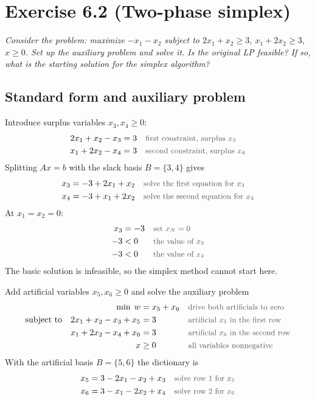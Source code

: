 \documentclass[a4paper,11pt]{article}
\newif\ifexplain
\newcommand{\aufgabe}[1]{\section*{#1}}
\newcommand{\angabe}[1]{\textit{#1}\par\smallskip}
\newcommand{\teil}[1]{\subsection*{#1}}
\newcommand{\why}[1]{\text{\small\color{black!65}#1}}
\newcommand{\explain}[1]{\ifexplain\begin{erklbox}#1\end{erklbox}\fi}
\begin{document}
\aufgabe{Exercise 6.2 (Two-phase simplex)}
\angabe{Consider the problem: maximize $-x_1-x_2$ subject to $2x_1+x_2\geq 3$, $x_1+2x_2\geq 3$, $x\geq 0$. Set up the auxiliary problem and solve it. Is the original LP feasible? If so, what is the starting solution for the simplex algorithm?}
\explain{Beide Nebenbedingungen sind $>$-Ungleichungen mit positiver rechter Seite. Der Ursprung verletzt sie, also gibt es keine zulässige Schlupfbasis zum Starten. Die Idee der zwei Phasen: künstliche Variablen $x_5,x_6$ machen die Gleichungen sofort lösbar, und Phase 1 drückt sie anschließend auf null. Gelingt das, bleibt eine zulässige Basis des Originalproblems übrig.}
\teil{Standard form and auxiliary problem}
Introduce surplus variables $x_3,x_4\geq 0$:
\begin{align*}
2x_1+x_2-x_3&=3&&\why{first constraint, surplus $x_3$}\\
x_1+2x_2-x_4&=3&&\why{second constraint, surplus $x_4$}
\end{align*}
Splitting $Ax=b$ with the slack basis $B=\{3,4\}$ gives
\begin{align*}
x_3&=-3+2x_1+x_2&&\why{solve the first equation for $x_3$}\\
x_4&=-3+x_1+2x_2&&\why{solve the second equation for $x_4$}
\end{align*}
At $x_1=x_2=0$:
\begin{align*}
x_3&=-3&&\why{set $x_N=0$}\\
-3&<0&&\why{the value of $x_3$}\\
-3&<0&&\why{the value of $x_4$}
\end{align*}
The basic solution is infeasible, so the simplex method cannot start here.
\explain{Die Schlupfvariable geht bei einer $>$-Ungleichung mit minus rein: $2x_1+x_2-x_3=3$ heißt, $x_3$ misst den Überschuss über die Schranke. Am Nullpunkt fehlt es noch an Erfüllung, deshalb ist $x_3$ negativ. Genau dieses Problem lösen die künstlichen Variablen.}
Add artificial variables $x_5,x_6\geq 0$ and solve the auxiliary problem
\begin{align*}
\min\; w&=x_5+x_6&&\why{drive both artificials to zero}\\
\text{subject to}\quad 2x_1+x_2-x_3+x_5&=3&&\why{artificial $x_5$ in the first row}\\
x_1+2x_2-x_4+x_6&=3&&\why{artificial $x_6$ in the second row}\\
x&\geq 0&&\why{all variables nonnegative}
\end{align*}
With the artificial basis $B=\{5,6\}$ the dictionary is
\begin{align*}
x_5&=3-2x_1-x_2+x_3&&\why{solve row 1 for $x_5$}\\
x_6&=3-x_1-2x_2+x_4&&\why{solve row 2 for $x_6$}
\end{align*}
\end{document}

